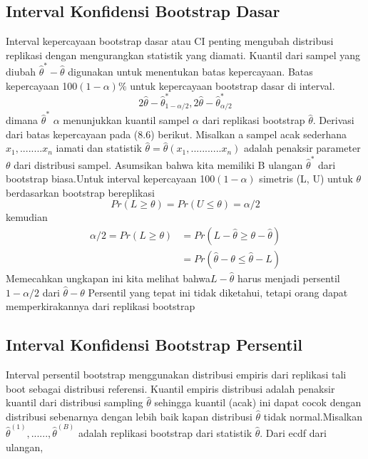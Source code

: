 \documentclass[a4paper,12pt]{article}
\theoremstyle{definition}
\begin{document}
\subsection{Interval Konfidensi Bootstrap Dasar}
Interval kepercayaan bootstrap dasar atau CI penting mengubah distribusi replikasi dengan mengurangkan statistik yang diamati. Kuantil dari sampel yang diubah $\widehat{\theta }^{*}-\widehat{\theta }$ digunakan untuk menentukan batas kepercayaan.
Batas kepercayaan 100$(1-\alpha )\%$  untuk kepercayaan bootstrap dasar di interval.
\begin{equation}
    2\widehat{\theta }-\widehat{\theta }_{1-\alpha /2}^{*},    2\widehat{\theta }-\widehat{\theta }_{\alpha /2}^{*}
\end{equation}
dimana $\widehat{\theta }^{*}$ $\alpha$ menunjukkan kuantil sampel $\alpha$ dari replikasi bootstrap $\widehat{\theta }$. Derivasi dari batas kepercayaan pada (8.6) berikut. Misalkan a sampel acak sederhana $x_{1},........x_{n}$ iamati dan statistik $\widehat{\theta }=\widehat{\theta}(x_{1},...........x_{n})$ adalah penaksir parameter $\theta $ dari distribusi sampel. Asumsikan bahwa kita memiliki B ulangan $\widehat{\theta }^{*}$ dari bootstrap biasa.Untuk interval kepercayaan  100$(1-\alpha )$ simetris (L, U) untuk $\theta$ berdasarkan bootstrap bereplikasi
\begin{equation*}
    Pr(L\geq \theta ) = Pr(U\leq \theta ) = \alpha /2
\end{equation*}
kemudian
\begin{equation*}
    \begin{split}
        \alpha /2=Pr(L\geq \theta )&=Pr(L-\widehat{\theta}\geq \theta -\widehat{\theta })\\
        &=Pr(\widehat{\theta }-\theta \leq \widehat{\theta }-L)
    \end{split}{}
 \end{equation*}
Memecahkan ungkapan ini kita melihat bahwa$L-\widehat{\theta }$ harus menjadi persentil $1-\alpha /2$ dari $\widehat{\theta}-{\theta}$ Persentil yang tepat ini tidak diketahui, tetapi orang dapat memperkirakannya
dari replikasi bootstrap 
\subsection{Interval Konfidensi Bootstrap Persentil}
Interval persentil bootstrap menggunakan distribusi empiris dari replikasi tali boot sebagai distribusi referensi. Kuantil empiris
distribusi adalah penaksir kuantil dari distribusi sampling $\widehat{\theta }$ sehingga kuantil (acak) ini dapat cocok dengan distribusi sebenarnya dengan lebih baik kapan distribusi $\widehat{\theta }$ tidak normal.Misalkan $\widehat{\theta }^{(1)},......,\widehat{\theta }^{(B)}$ adalah replikasi bootstrap dari statistik $\widehat{\theta }$. Dari ecdf dari ulangan, 
\end{document}
